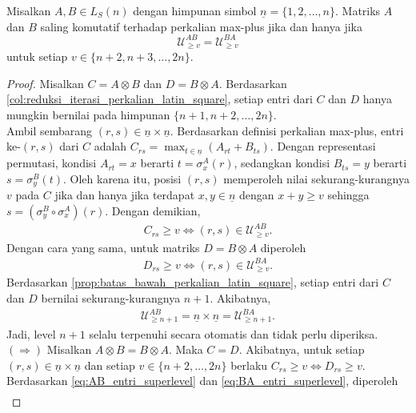 \begin{teorema}\label{thm:kriteria_komutatif_superlevel}
  Misalkan $A,B\in L_S(n)$ dengan himpunan simbol $\underline{n}=\{1,2,\ldots,n\}$. Matriks $A$ dan $B$ saling komutatif terhadap perkalian max-plus
  jika dan hanya jika
  \[
    \mathcal{U}_{\ge v}^{AB}
    =
    \mathcal{U}_{\ge v}^{BA}
  \]
  untuk setiap $v\in\{n+2,n+3,\ldots,2n\}$.
\end{teorema}
\begin{proof}
  Misalkan $C=A\otimes B$ dan $D=B\otimes A$. Berdasarkan \autoref{col:reduksi_iterasi_perkalian_latin_square}, setiap entri dari $C$ dan $D$ hanya mungkin bernilai pada himpunan $\{n+1,n+2,\ldots,2n\}$.\\
  Ambil sembarang $(r,s)\in \underline{n}\times \underline{n}$. Berdasarkan definisi perkalian max-plus, entri ke-$(r,s)$ dari $C$ adalah $C_{rs}=\max_{t\in \underline{n}}(A_{rt}+B_{ts})$. Dengan representasi permutasi, kondisi $A_{rt}=x$ berarti $t=\sigma_x^A(r)$, sedangkan kondisi $B_{ts}=y$ berarti $s=\sigma_y^B(t)$. Oleh karena itu, posisi $(r,s)$ memperoleh nilai sekurang-kurangnya $v$ pada $C$ jika dan hanya jika terdapat $x,y\in \underline{n}$ dengan $x+y\ge v$ sehingga $s=(\sigma_y^B\circ\sigma_x^A)(r)$. Dengan demikian,
  \begin{align}\label{eq:AB_entri_superlevel}
    C_{rs}\ge v
    \iff
    (r,s)\in\mathcal{U}_{\ge v}^{AB}.
  \end{align}
  Dengan cara yang sama, untuk matriks $D=B\otimes A$ diperoleh
  \begin{align}\label{eq:BA_entri_superlevel}
    D_{rs}\ge v
    \iff
    (r,s)\in\mathcal{U}_{\ge v}^{BA}.
  \end{align}
  Berdasarkan \autoref{prop:batas_bawah_perkalian_latin_square}, setiap entri dari $C$ dan $D$ bernilai sekurang-kurangnya $n+1$. Akibatnya,
  \begin{align}\label{eq:superlevel_nplus1_trivial}
    \mathcal{U}_{\ge n+1}^{AB}
    =
    \underline{n}\times \underline{n}
    =
    \mathcal{U}_{\ge n+1}^{BA}.
  \end{align}
  Jadi, level $n+1$ selalu terpenuhi secara otomatis dan tidak perlu diperiksa.\\
  \noindent$(\Rightarrow)$ Misalkan $A\otimes B=B\otimes A$. Maka $C=D$. Akibatnya, untuk setiap $(r,s)\in \underline{n}\times \underline{n}$ dan setiap $v\in\{n+2,\ldots,2n\}$ berlaku $C_{rs}\ge v \iff D_{rs}\ge v$. Berdasarkan \eqref{eq:AB_entri_superlevel} dan \eqref{eq:BA_entri_superlevel}, diperoleh
  \begin{align}\label{eq:kesamaan_keanggotaan_superlevel}

\end{align}
\end{proof}
